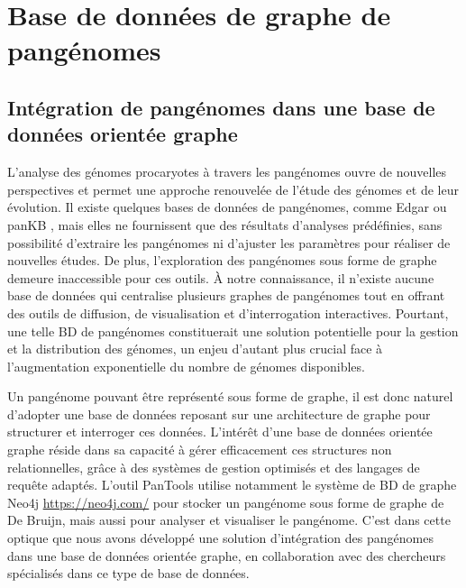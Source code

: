 \part{Base de données de graphe de pangénomes}
\label{part:DBpan}
\chapter{Intégration de pangénomes dans une base de données orientée graphe}

L’analyse des génomes procaryotes à travers les pangénomes ouvre de nouvelles perspectives et permet une approche renouvelée de l’étude des génomes et de leur évolution. Il existe quelques bases de données de pangénomes, comme Edgar \cite{blom_edgar_2009} ou panKB \cite{sun_pankb_2025}, mais elles ne fournissent que des résultats d’analyses prédéfinies, sans possibilité d’extraire les pangénomes ni d’ajuster les paramètres pour réaliser de nouvelles études. De plus, l’exploration des pangénomes sous forme de graphe demeure inaccessible pour ces outils. À notre connaissance, il n'existe aucune base de données qui centralise plusieurs graphes de pangénomes tout en offrant des outils de diffusion, de visualisation et d’interrogation interactives. Pourtant, une telle BD de pangénomes constituerait une solution potentielle pour la gestion et la distribution des génomes, un enjeu d’autant plus crucial face à l’augmentation exponentielle du nombre de génomes disponibles.

Un pangénome pouvant être représenté sous forme de graphe, il est donc naturel d’adopter une base de données reposant sur une architecture de graphe pour structurer et interroger ces données. L’intérêt d’une base de données orientée graphe réside dans sa capacité à gérer efficacement ces structures non relationnelles, grâce à des systèmes de gestion optimisés et des langages de requête adaptés. L'outil PanTools \cite{sheikhizadeh_pantools_2016} utilise notamment le système de BD de graphe Neo4j \url{https://neo4j.com/} pour stocker un pangénome sous forme de graphe de De Bruijn, mais aussi pour analyser et visualiser le pangénome. C’est dans cette optique que nous avons développé une solution d'intégration des pangénomes dans une base de données orientée graphe, en collaboration avec des chercheurs spécialisés dans ce type de base de données.

